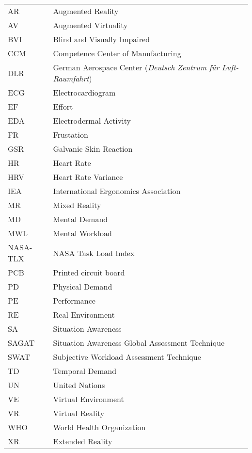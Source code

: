 
\begin{longtable}{ll}

AR & Augmented Reality \\
AV & Augmented Virtuality \\
BVI & Blind and Visually Impaired \\
CCM & Competence Center of Manufacturing \\
DLR & German Aerospace Center (\textit{Deutsch Zentrum für Luft- Raumfahrt}) \\
ECG & Electrocardiogram \\
EF & Effort \\
EDA & Electrodermal Activity \\
FR & Frustation \\
GSR & Galvanic Skin Reaction \\
HR & Heart Rate \\
HRV & Heart Rate Variance \\
IEA & International Ergonomics Association \\
MR & Mixed Reality \\
MD & Mental Demand \\
MWL & Mental Workload \\
NASA-TLX & NASA Task Load Index \\
PCB & Printed circuit board \\
PD & Physical Demand \\
PE & Performance \\
RE & Real Environment \\
SA & Situation Awareness \\
SAGAT & Situation Awareness Global Assessment Technique \\
SWAT & Subjective Workload Assessment Technique \\
TD & Temporal Demand \\
UN & United Nations \\
VE & Virtual Environment \\
VR & Virtual Reality \\
WHO & World Health Organization \\
XR & Extended Reality \\


\end{longtable}

